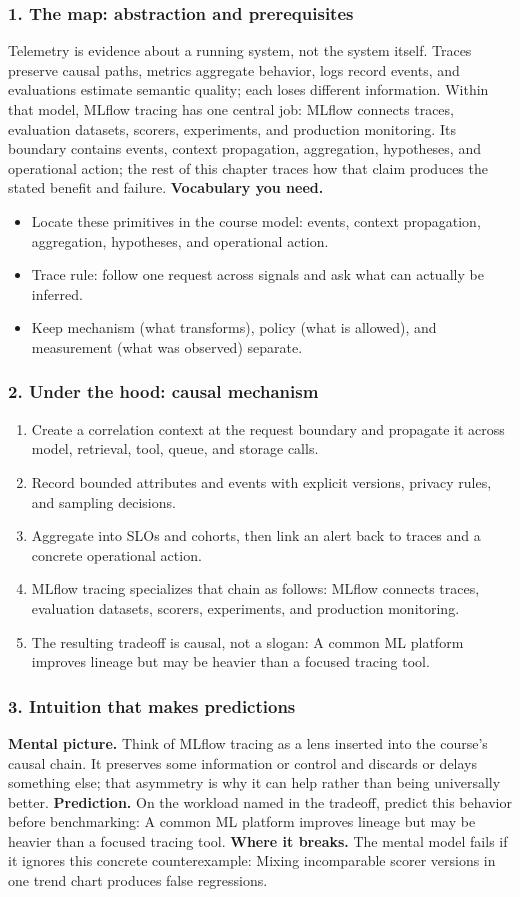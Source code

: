\subsubsection*{1. The map: abstraction and prerequisites}
Telemetry is evidence about a running system, not the system itself. Traces preserve causal paths, metrics aggregate behavior, logs record events, and evaluations estimate semantic quality; each loses different information.
Within that model, MLflow tracing has one central job: MLflow connects traces, evaluation datasets, scorers, experiments, and production monitoring. Its boundary contains events, context propagation, aggregation, hypotheses, and operational action; the rest of this chapter traces how that claim produces the stated benefit and failure.
\textbf{Vocabulary you need.}\begin{itemize}
\item Locate these primitives in the course model: events, context propagation, aggregation, hypotheses, and operational action.
\item Trace rule: follow one request across signals and ask what can actually be inferred.
\item Keep mechanism (what transforms), policy (what is allowed), and measurement (what was observed) separate.
\end{itemize}
\subsubsection*{2. Under the hood: causal mechanism}\begin{enumerate}
\item Create a correlation context at the request boundary and propagate it across model, retrieval, tool, queue, and storage calls.
\item Record bounded attributes and events with explicit versions, privacy rules, and sampling decisions.
\item Aggregate into SLOs and cohorts, then link an alert back to traces and a concrete operational action.
\item MLflow tracing specializes that chain as follows: MLflow connects traces, evaluation datasets, scorers, experiments, and production monitoring.
\item The resulting tradeoff is causal, not a slogan: A common ML platform improves lineage but may be heavier than a focused tracing tool.
\end{enumerate}
\subsubsection*{3. Intuition that makes predictions}
\textbf{Mental picture.} Think of MLflow tracing as a lens inserted into the course's causal chain. It preserves some information or control and discards or delays something else; that asymmetry is why it can help rather than being universally better.
\textbf{Prediction.} On the workload named in the tradeoff, predict this behavior before benchmarking: A common ML platform improves lineage but may be heavier than a focused tracing tool.
\textbf{Where it breaks.} The mental model fails if it ignores this concrete counterexample: Mixing incomparable scorer versions in one trend chart produces false regressions.
